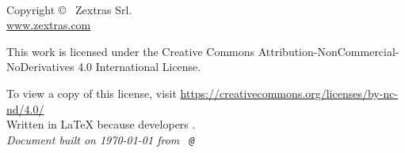 
\newpage
~\vfill
\thispagestyle{empty}

Copyright \copyright\ \the\year{} Zextras Srl.\\ %

\url{www.zextras.com}\\ %

\ccbyncsa{}

This work is licensed under the Creative Commons Attribution-NonCommercial-NoDerivatives 4.0 International License.

To view a copy of this license, visit \url{https://creativecommons.org/licenses/by-nc-nd/4.0/}\\

Written in \LaTeX{} because developers \ExcuseToUseLatex{}.\\

\textit{Document built on \today{} from \texttt{\branchName{} @\href{https://github.com/ZeXtras/OpenChat/tree/\commitId{}}{\shortCommitId{}}}} %
